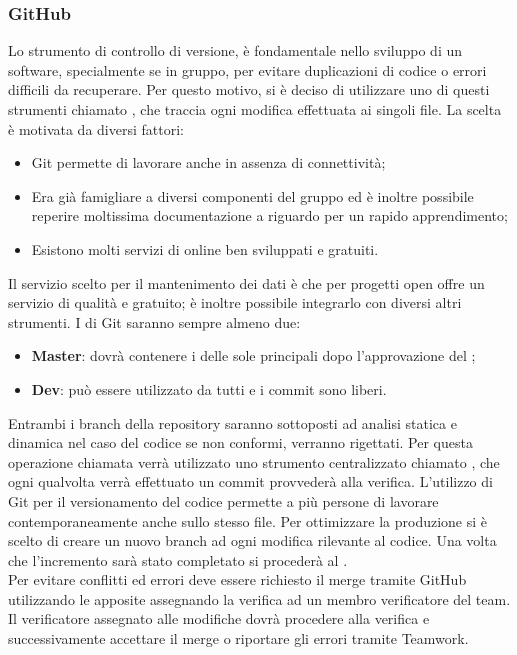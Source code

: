 \documentclass[../NormeDiProgetto.tex]{subfiles}
\begin{document}
\subsubsection{GitHub}
Lo strumento di controllo di versione, è fondamentale nello sviluppo di un software, specialmente se in gruppo, per evitare duplicazioni di codice o errori difficili da recuperare.
Per questo motivo, si è deciso di utilizzare uno di questi strumenti chiamato , che traccia ogni modifica effettuata ai singoli file. La scelta è motivata da diversi fattori:
\begin{itemize}
\item Git permette di lavorare anche in assenza di connettività;
\item Era già famigliare a diversi componenti del gruppo ed è inoltre possibile reperire moltissima documentazione a riguardo per un rapido apprendimento;
\item Esistono molti servizi di  online ben sviluppati e gratuiti.
\end{itemize}
Il servizio scelto per il mantenimento dei dati è  che per progetti open  offre un servizio di qualità e gratuito; è inoltre possibile integrarlo con diversi altri strumenti.
I  di Git saranno sempre almeno due:
\begin{itemize}
\item \textbf{Master}: dovrà contenere i  delle sole  principali dopo l'approvazione del \responsabilediprogetto;
\item \textbf{Dev}: può essere utilizzato da tutti e i commit sono liberi.
\end{itemize}
Entrambi i branch della repository saranno sottoposti ad analisi statica e dinamica nel caso del codice se non conformi, verranno rigettati.
Per questa operazione chiamata  verrà utilizzato uno strumento centralizzato chiamato , che ogni qualvolta verrà effettuato un commit provvederà alla verifica.
L'utilizzo di Git per il versionamento del codice permette a più persone di lavorare contemporaneamente anche sullo stesso file. Per ottimizzare la produzione si è scelto di creare un nuovo branch ad ogni modifica rilevante al  codice. Una volta che l'incremento sarà stato completato si procederà al . \\
Per evitare conflitti ed errori deve essere richiesto il merge tramite GitHub utilizzando le apposite  assegnando la verifica ad un membro verificatore del team. Il verificatore assegnato alle modifiche dovrà procedere alla verifica e successivamente accettare il merge o riportare gli errori tramite Teamwork.
\end{document}
